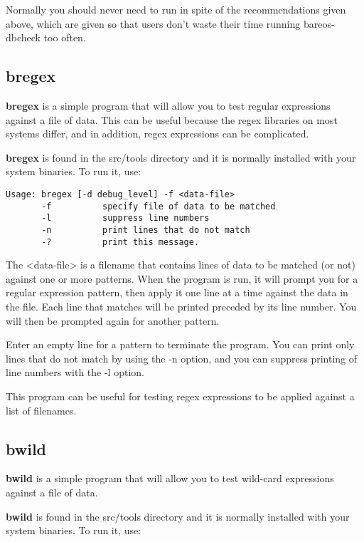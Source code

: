 Normally
you should never need to run  in spite of the
recommendations given above, which are given so that users don't
waste their time running bareos-dbcheck too often.

\subsection{bregex}
\label{bregex}

{\bf bregex} is a simple program that will allow you to test
regular expressions against a file of data. This can be useful
because the regex libraries on most systems differ, and in
addition, regex expressions can be complicated.

{\bf bregex} is found in the src/tools directory and it is
normally installed with your system binaries. To run it, use:

\begin{verbatim}
Usage: bregex [-d debug_level] -f <data-file>
       -f          specify file of data to be matched
       -l          suppress line numbers
       -n          print lines that do not match
       -?          print this message.
\end{verbatim}

The {\textless}data-file{\textgreater} is a filename that contains lines
of data to be matched (or not) against one or more patterns.
When the program is run, it will prompt you for a regular
expression pattern, then apply it one line at a time against
the data in the file. Each line that matches will be printed
preceded by its line number.  You will then be prompted again
for another pattern.

Enter an empty line for a pattern to terminate the program. You
can print only lines that do not match by using the -n option,
and you can suppress printing of line numbers with the -l option.

This program can be useful for testing regex expressions to be
applied against a list of filenames.

\subsection{bwild}
\label{bwild}

{\bf bwild} is a simple program that will allow you to test
wild-card expressions against a file of data.

{\bf bwild} is found in the src/tools directory and it is
normally installed with your system binaries. To run it, use:

